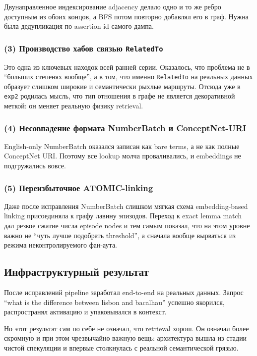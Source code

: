 Двунаправленное индексирование adjacency делало одно и то же ребро доступным из
обоих концов, а BFS потом повторно добавлял его в граф. Нужна была дедупликация
по assertion id самого дампа.

\subsubsection*{(3) Производство хабов связью \texttt{RelatedTo}}

Это одна из ключевых находок всей ранней серии. Оказалось, что проблема не в
``больших степенях вообще'', а в том, что именно \texttt{RelatedTo} на реальных
данных образует слишком широкие и семантически рыхлые маршруты. Отсюда уже в
\texttt{exp2} родилась мысль, что тип отношения в графе не является декоративной
меткой: он меняет реальную физику retrieval.

\subsubsection*{(4) Несовпадение формата NumberBatch и ConceptNet-URI}

English-only NumberBatch оказался записан как bare terms, а не как полные
ConceptNet URI. Поэтому все lookup молча проваливались, и embeddings не
подгружались вовсе.

\subsubsection*{(5) Переизбыточное ATOMIC-linking}

Даже после исправления NumberBatch слишком мягкая схема embedding-based linking
присоединяла к графу лавину эпизодов. Переход к exact lemma match дал резкое
сжатие числа episode nodes и тем самым показал, что на этом уровне важно не
``чуть лучше подобрать threshold'', а сначала вообще вырваться из режима
неконтролируемого фан-аута.

\subsection{Инфраструктурный результат}

После исправлений pipeline заработал end-to-end на реальных данных. Запрос
``what is the difference between lisbon and bacalhau'' успешно якорился,
распространял активацию и упаковывался в контекст.

Но этот результат сам по себе не означал, что retrieval хорош. Он означал более
скромную и при этом чрезвычайно важную вещь: архитектура вышла из стадии чистой
спекуляции и впервые столкнулась с реальной семантической грязью.

